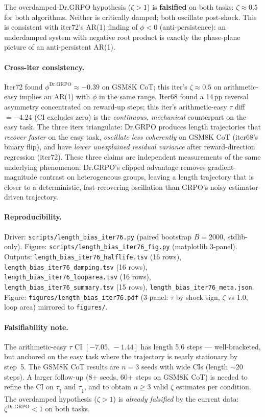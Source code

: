 \documentclass{article}
\begin{document}
The overdamped-Dr.GRPO hypothesis ($\zeta > 1$) is \textbf{falsified}
on both tasks: $\zeta \approx 0.5$ for both algorithms. Neither is
critically damped; both oscillate post-shock. This is consistent with
iter72's AR(1) finding of $\phi < 0$ (anti-persistence): an
underdamped system with negative root product is exactly the
phase-plane picture of an anti-persistent AR(1).

\paragraph{Cross-iter consistency.}
Iter72 found $\phi^{\mathrm{Dr.GRPO}} \approx -0.39$ on GSM8K CoT;
this iter's $\zeta \approx 0.5$ on arithmetic-easy implies an AR(1)
with $\phi$ in the same range. Iter68 found a 14\,pp reversal
asymmetry concentrated on reward-up steps; this iter's
arithmetic-easy $\tau$ diff $= -4.24$ (CI excludes zero) is the
\emph{continuous, mechanical} counterpart on the easy task. The
three iters triangulate: Dr.GRPO produces length trajectories that
\emph{recover faster} on the easy task, \emph{oscillate less
coherently} on GSM8K CoT (iter68's binary flip), and have
\emph{lower unexplained residual variance} after reward-direction
regression (iter72). These three claims are independent
measurements of the same underlying phenomenon: Dr.GRPO's clipped
advantage removes gradient-magnitude contrast on heterogeneous
groups, leaving a length trajectory that is closer to a
deterministic, fast-recovering oscillation than GRPO's noisy
estimator-driven trajectory.

\paragraph{Reproducibility.}
Driver: \texttt{scripts/length\_bias\_iter76.py} (paired bootstrap
$B = 2000$, stdlib-only). Figure:
\texttt{scripts/length\_bias\_iter76\_fig.py} (matplotlib 3-panel).
Outputs:
\texttt{length\_bias\_iter76\_halflife.tsv} (16 rows),
\texttt{length\_bias\_iter76\_damping.tsv} (16 rows),
\texttt{length\_bias\_iter76\_looparea.tsv} (16 rows),
\texttt{length\_bias\_iter76\_summary.tsv} (15 rows),
\texttt{length\_bias\_iter76\_meta.json}.
Figure: \texttt{figures/length\_bias\_iter76.pdf} (3-panel: $\tau$
by shock sign, $\zeta$ vs 1.0, loop area) mirrored to
\texttt{figures/}.

\paragraph{Falsifiability note.}
The arithmetic-easy $\tau$ CI $[-7.05,\,-1.44]$ has length 5.6
steps — well-bracketed, but anchored on the easy task where the
trajectory is nearly stationary by step~5. The GSM8K CoT results are
$n = 3$ seeds with wide CIs (length $\sim 20$ steps). A larger
follow-up (8+ seeds, 60+ steps on GSM8K CoT) is needed to refine
the CI on $\tau_{\uparrow}$ and $\tau_{\downarrow}$, and to obtain
$n \ge 3$ valid $\zeta$ estimates per condition. The overdamped
hypothesis ($\zeta > 1$) is \emph{already falsified} by the current
data: $\zeta^{\mathrm{Dr.GRPO}} < 1$ on both tasks. 
\end{document}
